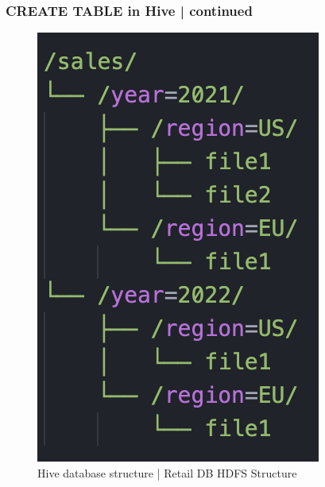\begin{frame}[fragile]
\frametitle{CREATE TABLE in Hive | continued}
\vspace{-0.5cm}\begin{tcolorbox}[colback=white,colframe=black,title= Part 5: Table Partitions]
\small
\vspace{-0.2cm}
\begin{figure}
	\includegraphics[width=\textwidth,height=.6\textheight,keepaspectratio]{./Figures/chapter-03/Screenshot_partitioned_example.png}
	\caption{Hive database structure | Retail DB HDFS Structure}	
	\end{figure}	
\end{tcolorbox}
	
\end{frame}

